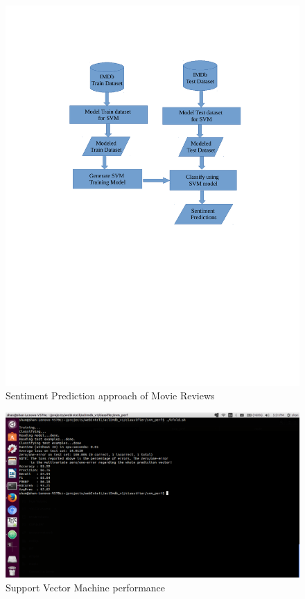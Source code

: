 \documentclass[conference]{IEEEtran}
\begin{document}
\begin{figure}
\centerline{\includegraphics[scale=0.6]{Implementation.pdf}}
\caption{Sentiment Prediction approach of Movie Reviews}
\label{fig:approach}
\end{figure}


\begin{center}
\begin{figure}[ht]
\centerline{\includegraphics[scale=0.3]{SentimentAnalysisSVM.png}}
\caption{Support Vector Machine performance}
\label{fig:SVMperformance}
\end{figure}    
\end{center}
\end{document}
